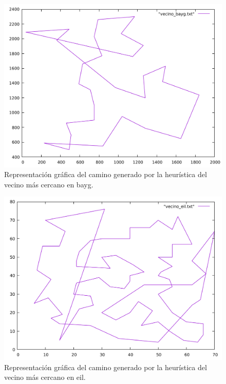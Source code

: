 \begin{figure}[H]
  \centering
  \includegraphics[scale=0.5]{../src/vecino_bayg.pdf}
  \caption{Representación gráfica del camino generado por la heurística del vecino más cercano en bayg.}
\end{figure} 

\begin{figure}[H]
  \centering
  \includegraphics[scale=0.5]{../src/vecino_eil.pdf}
  \caption{Representación gráfica del camino generado por la heurística del vecino más cercano en eil.}
\end{figure} 

